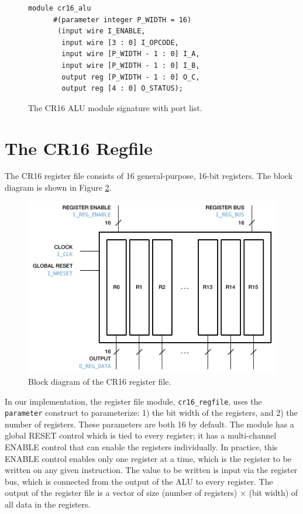\documentclass[conference]{IEEEtran}
\begin{document}
\begin{figure}
    \begin{lstlisting}[style={verilog-style}]
module cr16_alu
      #(parameter integer P_WIDTH = 16)
       (input wire I_ENABLE,
        input wire [3 : 0] I_OPCODE,
        input wire [P_WIDTH - 1 : 0] I_A,
        input wire [P_WIDTH - 1 : 0] I_B,
        output reg [P_WIDTH - 1 : 0] O_C,
        output reg [4 : 0] O_STATUS);
    \end{lstlisting}
    \caption{The CR16 ALU module signature with port list.}
    \label{figure_cr16_alu_module_signature}
\end{figure}

\section{The CR16 Regfile}

The CR16 register file consists of 16 general-purpose, 16-bit registers. The block diagram is shown in Figure \ref{fig:regfile_block_diagram}.

\begin{figure}[htbp]
    \centering
    \includegraphics[scale=1.0]{resources/figures/regfile_block_diagram.pdf}
    \caption{Block diagram of the CR16 register file.}
    \label{fig:regfile_block_diagram}
\end{figure}

In our implementation, the register file module, \verb|cr16_regfile|, uses the \verb|parameter| construct to parameterize: 1) the bit width of the registers, and 2) the number of registers. These parameters are both 16 by default. The module has a global RESET control which is tied to every register; it has a multi-channel ENABLE control that can enable the registers individually. In practice, this ENABLE control enables only one register at a time, which is the register to be written on any given instruction. The value to be written is input via the register bus, which is connected from the output of the ALU to every register. The output of the register file is a vector of size (number of registers) × (bit width) of all data in the registers.
\end{document}

